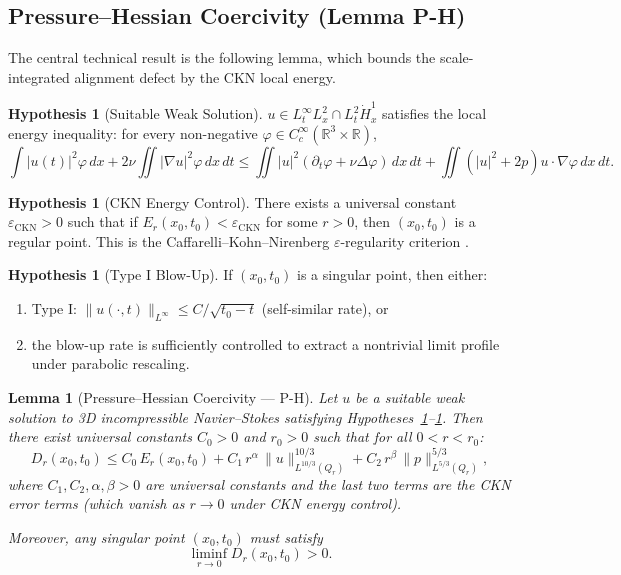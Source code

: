 \documentclass[11pt]{article}
\newtheorem{lemma}[theorem]{Lemma}
\theoremstyle{definition}
\newtheorem{hypothesis}[theorem]{Hypothesis}
\theoremstyle{remark}
\newcommand{\R}{\mathbb{R}}
\newcommand{\eps}{\varepsilon}
\begin{document}
\subsection{Pressure--Hessian Coercivity (Lemma P-H)}

The central technical result is the following lemma, which bounds the scale-integrated
alignment defect by the CKN local energy.

\begin{hypothesis}[Suitable Weak Solution]
\label{hyp:suitable}
$u \in L^\infty_t L^2_x \cap L^2_t \dot{H}^1_x$ satisfies the local energy inequality:
for every non-negative $\varphi \in C_c^\infty(\R^3 \times \R)$,
\begin{equation}\label{eq:LEI}
  \int |u(t)|^2 \varphi\, dx + 2\nu\iint |\nabla u|^2\varphi\, dx\, dt
  \leq \iint |u|^2(\partial_t\varphi + \nu\Delta\varphi)\, dx\, dt
  + \iint (|u|^2 + 2p)u\cdot\nabla\varphi\, dx\, dt.
\end{equation}
\end{hypothesis}

\begin{hypothesis}[CKN Energy Control]
\label{hyp:CKN}
There exists a universal constant $\eps_{\mathrm{CKN}} > 0$ such that if
$E_r(x_0, t_0) < \eps_{\mathrm{CKN}}$ for some $r > 0$, then $(x_0, t_0)$ is a
regular point.  This is the Caffarelli--Kohn--Nirenberg $\eps$-regularity criterion
\cite{CKN}.
\end{hypothesis}

\begin{hypothesis}[Type I Blow-Up]
\label{hyp:typeI}
If $(x_0, t_0)$ is a singular point, then either:
\begin{enumerate}[nosep]
  \item[(a)] Type I: $\|u(\cdot,t)\|_{L^\infty} \leq C/\sqrt{t_0 - t}$
    (self-similar rate), or
  \item[(b)] the blow-up rate is sufficiently controlled to extract a nontrivial
    limit profile under parabolic rescaling.
\end{enumerate}
\end{hypothesis}

\begin{lemma}[Pressure--Hessian Coercivity --- P-H]
\label{lem:PH}
Let $u$ be a suitable weak solution to 3D incompressible Navier--Stokes satisfying
Hypotheses~\ref{hyp:suitable}--\ref{hyp:CKN}.
Then there exist universal constants $C_0 > 0$ and $r_0 > 0$ such that for all
$0 < r < r_0$:
\begin{equation}\label{eq:PH-bound}
  D_r(x_0, t_0) \leq C_0\, E_r(x_0, t_0)
  + C_1\, r^\alpha\, \|u\|_{L^{10/3}(Q_r)}^{10/3}
  + C_2\, r^\beta\, \|p\|_{L^{5/3}(Q_r)}^{5/3},
\end{equation}
where $C_1, C_2, \alpha, \beta > 0$ are universal constants and the last two terms
are the CKN error terms (which vanish as $r \to 0$ under CKN energy control).

Moreover, any singular point $(x_0, t_0)$ must satisfy
\begin{equation}\label{eq:PH-singular}
  \liminf_{r\to 0} D_r(x_0, t_0) > 0.
\end{equation}
\end{lemma}
\end{document}
